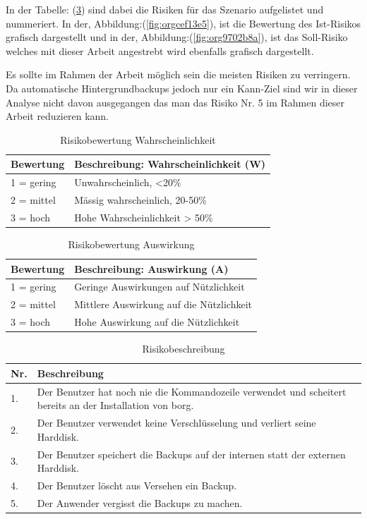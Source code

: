 In der Tabelle: (\ref{tab:org2372ddb}) sind dabei die Risiken für das
Szenario aufgelistet und nummeriert. In der, Abbildung:(\ref{fig:orgcef13e5}), ist die
Bewertung des Ist-Risikos grafisch dargestellt und in der,
Abbildung:(\ref{fig:org9702b8a}), ist das Soll-Risiko welches mit dieser Arbeit
angestrebt wird ebenfalls grafisch dargestellt.

Es sollte im Rahmen der Arbeit möglich sein die meisten Risiken zu verringern.
Da automatische Hintergrundbackups jedoch nur ein Kann-Ziel sind wir in dieser
Analyse nicht davon ausgegangen das man das Risiko Nr. 5 im Rahmen dieser
Arbeit reduzieren kann.

\begin{table}[H]
\centering
\begin{tabular}{l|l}
\textbf{Bewertung} & \textbf{Beschreibung: Wahrscheinlichkeit (W)}\\
\hline
1 = gering & Unwahrscheinlich, <20\%\\
2 = mittel & Mässig wahrscheinlich, 20-50\%\\
3 = hoch & Hohe Wahrscheinlichkeit > 50\%\\
\end{tabular}
\caption{\label{tab:org63dd697}
Risikobewertung Wahrscheinlichkeit}

\end{table}

\begin{table}[H]
\centering
\begin{tabular}{l|l}
\textbf{Bewertung} & \textbf{Beschreibung: Auswirkung (A)}\\
\hline
1 = gering & Geringe Auswirkungen auf Nützlichkeit\\
2 = mittel & Mittlere Auswirkung auf die Nützlichkeit\\
3 = hoch & Hohe Auswirkung auf die Nützlichkeit\\
\end{tabular}
\caption{\label{tab:orgb488f77}
Risikobewertung Auswirkung}

\end{table}

\begin{table}[H]
\centering
\begin{tabular}{|>{\columncolor[HTML]{EFEFEF}}p{}|p{}|}
\hline
\textbf{Nr.}\cellcolor[HTML]{C0C0C0} & \textbf{Beschreibung}\cellcolor[HTML]{C0C0C0}\\
\hline
1. & Der Benutzer hat noch nie die Kommandozeile verwendet und scheitert bereits an der Installation von \gls{borg}.\\
\hline
2. & Der Benutzer verwendet keine Verschlüsselung und verliert seine Harddisk.\\
\hline
3. & Der Benutzer speichert die Backups auf der internen statt der externen Harddisk.\\
\hline
4. & Der Benutzer löscht aus Versehen ein Backup.\\
\hline
5. & Der Anwender vergisst die Backups zu machen.\\
\hline
\end{tabular}
\caption{\label{tab:org2372ddb}
Risikobeschreibung}

\end{table}

